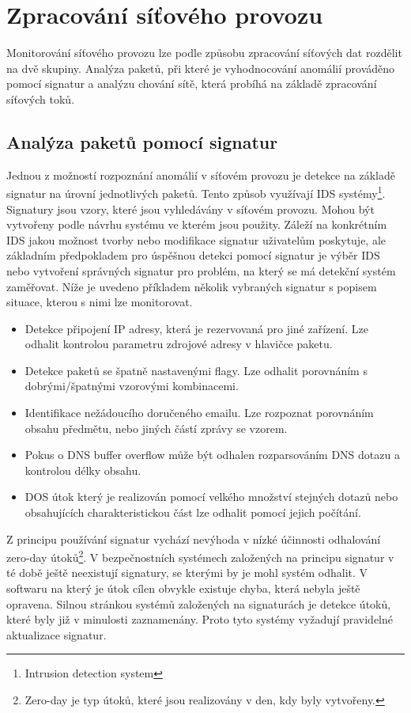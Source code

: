 \documentclass[thesis=M,czech]{FITthesis}[2012/06/26]
\begin{document}
\section{Zpracování síťového provozu}
Monitorování síťového provozu lze podle způsobu zpracování síťových dat rozdělit na dvě skupiny. Analýza paketů, při které je vyhodnocování anomálií prováděno pomocí signatur a analýzu chování sítě, která probíhá na základě zpracování síťových toků.

\subsection{Analýza paketů pomocí signatur}
Jednou z možností rozpoznání anomálií v síťovém provozu je detekce na základě signatur na úrovní jednotlivých paketů. Tento způsob využívají IDS systémy\footnote{Intrusion detection system}. Signatury jsou vzory, které jsou vyhledávány v síťovém provozu. Mohou být vytvořeny podle návrhu systému ve kterém jsou použity. Záleží na konkrétním IDS jakou možnost tvorby nebo modifikace signatur uživatelům poskytuje, ale základním předpokladem pro úspěšnou detekci pomocí signatur je výběr IDS nebo vytvoření správných signatur pro problém, na který se má detekční systém zaměřovat. Níže je uvedeno příkladem několik vybraných signatur s popisem situace, kterou s nimi lze monitorovat. \cite{signatures}
\begin{itemize}
	\item Detekce připojení IP adresy, která je rezervovaná pro jiné zařízení. Lze odhalit kontrolou parametru zdrojové adresy v hlavičce paketu.
	\item Detekce paketů se špatně nastavenými flagy. Lze odhalit porovnáním s dobrými/špatnými vzorovými kombinacemi.
	\item Identifikace nežádoucího doručeného emailu. Lze rozpoznat porovnáním obsahu předmětu, nebo jiných částí zprávy se vzorem.
	\item Pokus o DNS buffer overflow může být odhalen rozparsováním DNS dotazu a kontrolou délky obsahu.
	\item DOS útok který je realizován pomocí velkého množství stejných dotazů nebo obsahujících charakteristickou část lze odhalit pomocí jejich počítání.
\end{itemize}
Z principu používání signatur vychází nevýhoda v nízké účinnosti odhalování zero-day útoků\footnote{Zero-day je typ útoků, které jsou realizovány v den, kdy byly vytvořeny.}. V bezpečnostních systémech založených na principu signatur v té době ještě neexistují signatury, se kterými by je mohl systém odhalit. V softwaru na který je útok cílen obvykle existuje chyba, která nebyla ještě opravena.\cite{zeroday} Silnou stránkou systémů založených na signaturách je detekce útoků, které byly již v minulosti zaznamenány. Proto tyto systémy vyžadují pravidelné aktualizace signatur.
\end{document}
